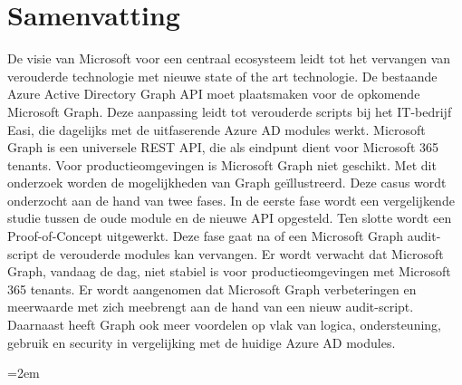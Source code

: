 \documentclass[dutch,dit,thesis]{hogentreport}
\begin{document}
\section*{Samenvatting}

De visie van Microsoft voor een centraal ecosysteem leidt tot het vervangen van verouderde technologie met nieuwe state of the art technologie. De bestaande Azure Active Directory Graph API moet plaatsmaken voor de opkomende Microsoft Graph. Deze aanpassing leidt tot verouderde scripts bij het IT-bedrijf Easi, die dagelijks met de uitfaserende Azure AD modules werkt. Microsoft Graph is een universele REST API, die als eindpunt dient voor Microsoft 365 tenants. Voor productieomgevingen is Microsoft Graph niet geschikt. Met dit onderzoek worden de mogelijkheden van Graph geïllustreerd. Deze casus wordt onderzocht aan de hand van twee fases. In de eerste fase wordt een vergelijkende studie tussen de oude module en de nieuwe API opgesteld. Ten slotte wordt een Proof-of-Concept uitgewerkt. Deze fase gaat na of een Microsoft Graph audit-script de verouderde modules kan vervangen. Er wordt verwacht dat Microsoft Graph, vandaag de dag, niet stabiel is voor productieomgevingen met Microsoft 365 tenants. Er wordt aangenomen dat Microsoft Graph verbeteringen en meerwaarde met zich meebrengt aan de hand van een nieuw audit-script. Daarnaast heeft Graph ook meer voordelen op vlak van logica, ondersteuning, gebruik en security in vergelijking met de huidige Azure AD modules.




%


\backmatter{}

\emergencystretch=2em
\setlength\bibitemsep{2pt} %
\printbibliography[heading=bibintoc]
\end{document}
